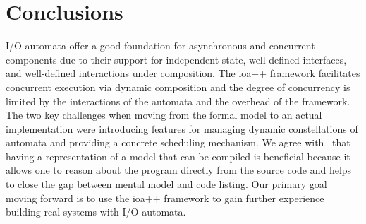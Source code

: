 \section{Conclusions\label{conclusion}}

I/O automata offer a good foundation for asynchronous and concurrent components due to their support for independent state, well-defined interfaces, and well-defined interactions under composition.
The ioa++ framework facilitates concurrent execution via dynamic composition and the degree of concurrency is limited by the interactions of the automata and the overhead of the framework.
The two key challenges when moving from the formal model to an actual implementation were introducing features for managing dynamic constellations of automata and providing a concrete scheduling mechanism.
We agree with~\cite{georgiou2009automated} that having a representation of a model that can be compiled is beneficial because it allows one to reason about the program directly from the source code and helps to close the gap between mental model and code listing.
Our primary goal moving forward is to use the ioa++ framework to gain further experience building real systems with I/O automata.


